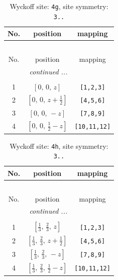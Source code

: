 \documentclass[fleqn,8pt]{jsarticle}
\begin{document}
\begin{longtable}{ccc}
\caption{Wyckoff site: {\tt 4g}, site symmetry: {\tt 3..}}
 \\
 \hline \hline
No. & position & mapping \\ \hline \endfirsthead

\multicolumn{2}{l}{\tablename\ \thetable{}} \\
 \hline \hline
No. & position & mapping \\ \hline \endhead

 \hline \hline
\multicolumn{2}{r}{\footnotesize\it continued ...} \\ \endfoot

 \hline \hline
\multicolumn{2}{r}{} \\ \endlastfoot

1 & $\left[ 0,\, 0,\, z \right]$ & {\tt [1,2,3]} \\ \hline
2 & $\left[ 0,\, 0,\, z + \frac{1}{2} \right]$ & {\tt [4,5,6]} \\ \hline
3 & $\left[ 0,\, 0,\, - z \right]$ & {\tt [7,8,9]} \\ \hline
4 & $\left[ 0,\, 0,\, \frac{1}{2} - z \right]$ & {\tt [10,11,12]} \\
\end{longtable}
\renewcommand{\arraystretch}{1.2}
\begin{longtable}{ccc}
\caption{Wyckoff site: {\tt 4h}, site symmetry: {\tt 3..}}
 \\
 \hline \hline
No. & position & mapping \\ \hline \endfirsthead

\multicolumn{2}{l}{\tablename\ \thetable{}} \\
 \hline \hline
No. & position & mapping \\ \hline \endhead

 \hline \hline
\multicolumn{2}{r}{\footnotesize\it continued ...} \\ \endfoot

 \hline \hline
\multicolumn{2}{r}{} \\ \endlastfoot

1 & $\left[ \frac{1}{3},\, \frac{2}{3},\, z \right]$ & {\tt [1,2,3]} \\ \hline
2 & $\left[ \frac{1}{3},\, \frac{2}{3},\, z + \frac{1}{2} \right]$ & {\tt [4,5,6]} \\ \hline
3 & $\left[ \frac{1}{3},\, \frac{2}{3},\, - z \right]$ & {\tt [7,8,9]} \\ \hline
4 & $\left[ \frac{1}{3},\, \frac{2}{3},\, \frac{1}{2} - z \right]$ & {\tt [10,11,12]} \\
\end{longtable}
\end{document}
